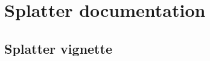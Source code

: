 \documentclass[11pt,a4paper,titlepage,twoside,openright]{style/unimelbthesis}
\theoremstyle{definition}
\theoremstyle{definition}
\theoremstyle{definition}
\theoremstyle{remark}
\begin{document}
\begin{mainmatter}
\clearpage

\hypertarget{splatter-docs}{%
\chapter{Splatter documentation}\label{splatter-docs}}

\hypertarget{splatter-vignette}{%
\section{Splatter vignette}\label{splatter-vignette}}


\end{mainmatter}
\end{document}
